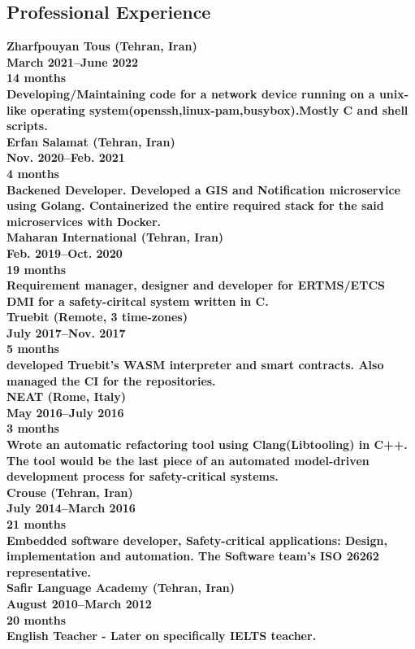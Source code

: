 \documentclass[8pt]{article}
\begin{document}
\begin{multicols}{2}
  \section*{Professional Experience}
  \bf Zharfpouyan Tous (Tehran, Iran)\\
  March 2021--June 2022\\
  14 months\\
  \normalfont Developing/Maintaining code for a network device running on a unix-like operating system(openssh,linux-pam,busybox).Mostly C and shell scripts.\\[5pt]
  \bf Erfan Salamat (Tehran, Iran)\\
  Nov. 2020--Feb. 2021\\
  4 months\\
  \normalfont Backened Developer. Developed a GIS and Notification microservice using Golang. Containerized the entire required stack for the said microservices with Docker.\\[5pt]
  \bf Maharan International (Tehran, Iran)\\
  Feb. 2019--Oct. 2020\\
  19 months\\
  \normalfont Requirement manager, designer and developer for ERTMS/ETCS DMI for a safety-ciritcal system written in C.\\[5pt]
  \bf Truebit (Remote, 3 time-zones)\\
  July 2017--Nov. 2017\\
  5 months\\
  \normalfont developed Truebit's WASM interpreter and smart contracts. Also managed the CI for the repositories.\\[5pt]
  \bf NEAT (Rome, Italy)\\
  May 2016--July 2016\\
  3 months\\
  \normalfont Wrote an automatic refactoring tool using Clang(Libtooling) in C++. The tool would be the last piece of an automated model-driven development process for safety-critical systems.\\[5pt]
  \bf Crouse (Tehran, Iran)\\
  July 2014--March 2016\\
  21 months\\
  \normalfont Embedded software developer, Safety-critical applications: Design, implementation and automation. The Software team's ISO 26262 representative.\\[5pt]
  \bf Safir Language Academy (Tehran, Iran)\\
  August 2010--March 2012\\
  20 months\\
  \normalfont English Teacher - Later on specifically IELTS teacher.\\[5pt]


\end{multicols}
\end{document}
